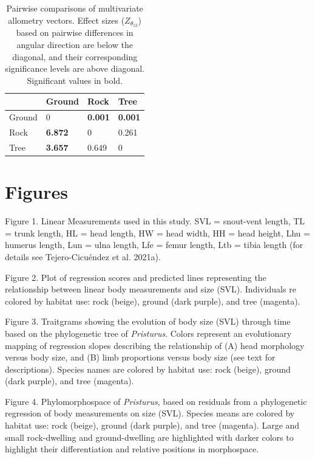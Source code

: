 \documentclass[
]{article}
\begin{document}
\newpage

\begin{table}[H]

\caption{\label{tab:unnamed-chunk-2}Pairwise comparisons of multivariate allometry vectors. Effect sizes ($Z_{\theta_{12}}$) based on pairwise differences in angular direction are below the diagonal, and their corresponding significance levels are above diagonal. Significant values in bold.}
\centering
\begin{tabular}[t]{llll}
\toprule
  & Ground & Rock & Tree\\
\midrule
Ground & 0 & \textbf{0.001} & \textbf{0.001}\\
Rock & \textbf{6.872} & 0 & 0.261\\
Tree & \textbf{3.657} & 0.649 & 0\\
\bottomrule
\end{tabular}
\end{table}

\newpage

\hypertarget{figures}{%
\section{Figures}\label{figures}}

Figure 1. Linear Measurements used in this study. SVL = snout-vent
length, TL = trunk length, HL = head length, HW = head width, HH = head
height, Lhu = humerus length, Lun = ulna length, Lfe = femur length, Ltb
= tibia length (for details see Tejero-Cicuéndez et al. 2021a).
\hfill\break

Figure 2. Plot of regression scores and predicted lines representing the
relationship between linear body measurements and size (SVL).
Individuals re colored by habitat use: rock (beige), ground (dark
purple), and tree (magenta). \hfill\break

Figure 3. Traitgrams showing the evolution of body size (SVL) through
time based on the phylogenetic tree of \emph{Pristurus}. Colors
represent an evolutionary mapping of regression slopes describing the
relationship of (A) head morphology versus body size, and (B) limb
proportions versus body size (see text for descriptions). Species names
are colored by habitat use: rock (beige), ground (dark purple), and tree
(magenta). \hfill\break

Figure 4. Phylomorphospace of \emph{Pristurus}, based on residuals from
a phylogenetic regression of body measurements on size (SVL). Species
means are colored by habitat use: rock (beige), ground (dark purple),
and tree (magenta). Large and small rock-dwelling and ground-dwelling
are highlighted with darker colors to highlight their differentiation
and relative positions in morphospace.
\end{document}
